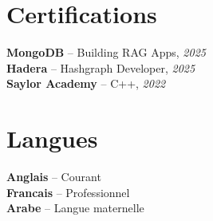 \documentclass[10pt,a4paper]{article}
\begin{document}
\vspace{3pt}
\section*{Certifications}
{\small
\textbf{MongoDB} -- Building RAG Apps, \textit{2025}\\[1pt]
\textbf{Hadera} -- Hashgraph Developer, \textit{2025}\\[1pt]
\textbf{Saylor Academy} -- C++, \textit{2022}
}

\section*{Langues}
{\small
\textbf{Anglais} -- Courant\\[1pt]
\textbf{Francais} -- Professionnel\\[1pt]
\textbf{Arabe} -- Langue maternelle
}
\end{document}

